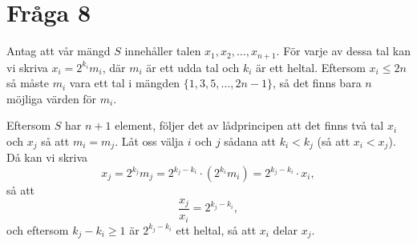 \documentclass[nobib]{tufte-handout}
\begin{document}
\section{Fråga 8}

Antag att vår mängd $S$ innehåller talen $x_1, x_2, \dots, x_{n+1}$. För varje av dessa tal kan vi skriva $x_i = 2^{k_i} m_i$, där $m_i$ är ett udda tal och $k_i$ är ett heltal. Eftersom $x_i \le 2n$ så måste $m_i$ vara ett tal i mängden $\{1, 3, 5, \dots, 2n-1\}$, så det finns bara $n$ möjliga värden för $m_i$.

Eftersom $S$ har $n+1$ element, följer det av lådprincipen att det finns två tal $x_i$ och $x_j$ så att $m_i = m_j$. Låt oss välja $i$ och $j$ sådana att $k_i < k_j$ (så att $x_i < x_j$). Då kan vi skriva
$$x_j = 2^{k_j} m_j = 2^{k_j - k_i} \cdot (2^{k_i} m_i) = 2^{k_j - k_i} \cdot x_i,$$
så att
$$\frac{x_j}{x_i} = 2^{k_j - k_i},$$
och eftersom $k_j - k_i \ge 1$ är $2^{k_j - k_i}$ ett heltal, så att $x_i$ delar $x_j$.

%
%
\end{document}
